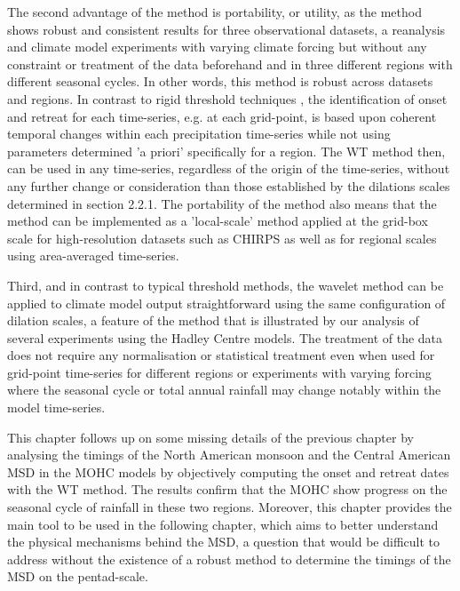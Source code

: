 The second advantage of the method is portability, or utility, as the method shows robust and consistent results for three observational datasets, a reanalysis and climate model experiments with varying climate forcing but without any constraint or treatment of the data beforehand and in three different regions with different seasonal cycles. In other words, this method is robust across datasets and regions. In contrast to rigid threshold techniques \citep[e.g.][]{liebmann2001interannual}, the identification of onset and retreat for each time-series, e.g. at each grid-point, is based upon coherent temporal changes within each precipitation time-series while not using parameters determined 'a priori' specifically for a region. The WT method then, can be used in any time-series, regardless of the origin of the time-series, without any further change or consideration than those established by the dilations scales determined in section 2.2.1. 
The portability of the method also means that the method can be implemented as a 'local-scale' method applied at the grid-box scale for high-resolution datasets such as CHIRPS as well as for regional scales using area-averaged time-series.

Third, and in contrast to typical threshold methods, the wavelet method can be applied to climate model output straightforward using the same configuration of dilation scales, a feature of the method that is illustrated by our analysis of several experiments using the Hadley Centre models. The treatment of the data does not require  any normalisation or statistical treatment even when used for grid-point time-series for different regions or experiments with varying forcing where the seasonal cycle or total annual rainfall may change notably within the model time-series.


This chapter follows up on some missing details of the previous chapter by analysing the timings  of the North American monsoon and the Central American MSD in the MOHC models by objectively computing the onset and retreat dates with the WT method. The results confirm that the MOHC show progress on the seasonal cycle of rainfall in these two regions.
Moreover, this chapter provides the main tool to be used in the following chapter, which aims to better understand the physical mechanisms behind the MSD, a question that would be difficult to address without the existence of a robust method to determine the timings of the MSD on the pentad-scale.